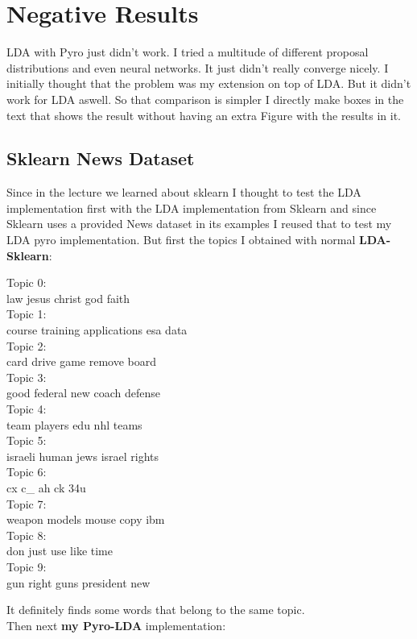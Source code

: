 \documentclass[10pt,conference,compsocconf]{IEEEtran}
\begin{document}
\section{Negative Results}

LDA with Pyro just didn't work. I tried a multitude of different proposal distributions and even neural networks. It just didn't really converge nicely. I initially thought that the problem was my extension on top of LDA. But it didn't work for LDA aswell. So that comparison is simpler I directly make boxes in the text that shows the result without having an extra Figure with the results in it. 

\subsection{Sklearn News Dataset}

Since in the lecture we learned about sklearn I thought to test the LDA implementation first with the LDA implementation from Sklearn and since Sklearn uses a provided News dataset in its examples I reused that to test my LDA pyro implementation. But first the topics I obtained with normal \textbf{LDA-Sklearn}: 
\begin{framed}
	Topic 0:\\
	law jesus christ god faith\\
	Topic 1:\\
	course training applications esa data\\
	Topic 2:\\
	card drive game remove board\\
	Topic 3:\\
	good federal new coach defense\\
	Topic 4:\\
	team players edu nhl teams\\
	Topic 5:\\
	israeli human jews israel rights\\
	Topic 6:\\
	cx c\_ ah ck 34u\\
	Topic 7:\\
	weapon models mouse copy ibm\\
	Topic 8:\\
	don just use like time\\
	Topic 9:\\
	gun right guns president new\\
\end{framed}
It definitely finds some words that belong to the same topic.\\
Then next \textbf{my Pyro-LDA} implementation:
\end{document}
